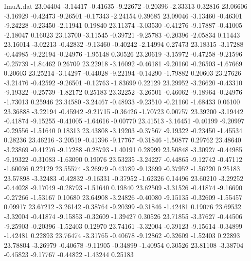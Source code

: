 \begin{filecontents}{ImuA.dat}
  23.04404   -3.14417   -0.41635   -9.22672   -0.20396   -2.33313    0.32816
  23.06606   -3.16929   -0.42473   -9.26501   -0.17343   -2.24154    0.39685
  23.09046   -3.13460   -0.46301   -9.24228   -0.23450   -2.11941    0.19840
  23.11374   -3.03530   -0.41276   -9.17887   -0.41005   -2.18047    0.16023
  23.13700   -3.11545   -0.39721   -9.25783   -0.20396   -2.05834    0.11443
  23.16014   -3.02213   -0.42832   -9.13460   -0.40242   -2.14994    0.27473
  23.18315   -3.17288   -0.44985   -9.22194   -0.24976   -1.95148    0.30526
  23.20619   -3.15972   -0.47258   -9.21596   -0.25739   -1.84462    0.26709
  23.22918   -3.16092   -0.46181   -9.20160   -0.26503   -1.67669    0.20603
  23.25214   -3.14297   -0.44028   -9.22194   -0.14290   -1.79882    0.20603
  23.27626   -3.21476   -0.42592   -9.26501   -0.12763   -1.83699    0.22129
  23.29952   -3.26620   -0.43310   -9.19322   -0.25739   -1.82172    0.25183
  23.32252   -3.26501   -0.46062   -9.18964   -0.24976   -1.73013    0.25946
  23.34580   -3.24467   -0.48933   -9.23510   -0.21160   -1.68433    0.06100
  23.36888   -3.22194   -0.45942   -9.21715   -0.36426   -1.70723    0.00757
  23.39200   -3.19442   -0.41874   -9.15255   -0.41005   -1.64616   -0.00770
  23.41513   -3.16451   -0.40199   -9.20997   -0.29556   -1.51640    0.18313
  23.43808   -3.19203   -0.37567   -9.19322   -0.23450   -1.45534    0.28236
  23.46216   -3.20519   -0.41396   -9.17767   -0.31846   -1.50877    0.29762
  23.48640   -3.23869   -0.41276   -9.17288   -0.28793   -1.40191    0.28999
  23.50848   -3.30927   -0.44985   -9.19322   -0.31083   -1.63090    0.19076
  23.53235   -3.24227   -0.44865   -9.12742   -0.47112   -1.60036    0.22129
  23.55574   -3.26979   -0.43789   -9.13699   -0.37952   -1.56220    0.25183
  23.57898   -3.32483   -0.42832   -9.16331   -0.37952   -1.62326    0.14496
  23.60210   -3.29252   -0.44028   -9.17049   -0.28793   -1.51640    0.19840
  23.62509   -3.31526   -0.41874   -9.16690   -0.27266   -1.53167    0.10680
  23.64908   -3.24826   -0.40080   -9.15135   -0.32609   -1.55457    0.09917
  23.67212   -3.26142   -0.38764   -9.20399   -0.31846   -1.42481    0.19076
  23.69532   -3.32004   -0.41874   -9.15853   -0.32609   -1.39427    0.30526
  23.71855   -3.37627   -0.44506   -9.25903   -0.20396   -1.52403    0.12970
  23.74161   -3.32004   -0.39123   -9.15614   -0.34899   -1.42481    0.22893
  23.76474   -3.31765   -0.40678   -9.12862   -0.32609   -1.52403    0.22893
  23.78804   -3.26979   -0.40678   -9.11905   -0.34899   -1.40954    0.30526
  23.81108   -3.38704   -0.45823   -9.17767   -0.44822   -1.43244    0.25183

\end{filecontents}
